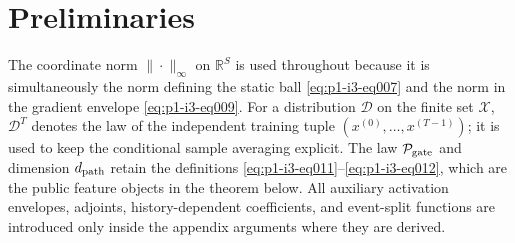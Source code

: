 \section{Preliminaries}
\label{sec:preliminaries}

The coordinate norm $\|\cdot\|_\infty$ on $\mathbb R^S$ is used throughout
because it is simultaneously the norm defining the static ball \eqref{eq:p1-i3-eq007} and the
norm in the gradient envelope \eqref{eq:p1-i3-eq009}.  For a distribution $\mathcal D$ on the
finite set $\mathcal X$, $\mathcal D^T$ denotes the law of the independent
training tuple $(x^{(0)},\ldots,x^{(T-1)})$; it is used to keep the conditional
sample averaging explicit.  The law $\mathcal P_{\rm gate}$ and dimension
$d_{\rm path}$ retain the definitions \eqref{eq:p1-i3-eq011}--\eqref{eq:p1-i3-eq012}, which are the public feature
objects in the theorem below.  All auxiliary activation envelopes, adjoints,
history-dependent coefficients, and event-split functions are introduced only
inside the appendix arguments where they are derived.
